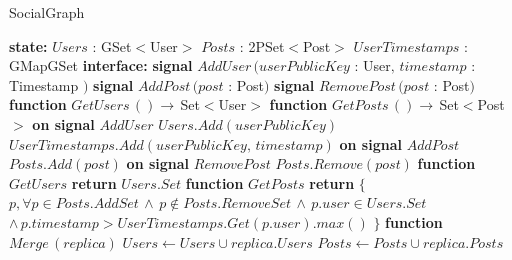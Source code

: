 \documentclass{article}
\begin{document}
\begin{algorithm}
\caption{SocialGraph}
\begin{algorithmic}
\State \textbf{state:}
\State \hspace{\algorithmicindent} $Users$ : GSet$<$User$>$ 
\State \hspace{\algorithmicindent} $Posts$ : 2PSet$<$Post$>$ 
\State \hspace{\algorithmicindent} $UserTimestamps$ : GMapGSet 
\State
\State \textbf{interface:}
\State \hspace{\algorithmicindent} \textbf{signal} $AddUser\,(userPublicKey$ : User$,\,timestamp$ : Timestamp $)$
\State \hspace{\algorithmicindent} \textbf{signal} $AddPost\,(post$ : Post$)$
\State \hspace{\algorithmicindent} \textbf{signal} $RemovePost\,(post$ : Post$)$
\State \hspace{\algorithmicindent} \textbf{function} $GetUsers\,() \rightarrow\, $Set$<$User$>$
\State \hspace{\algorithmicindent} \textbf{function} $GetPosts\,() \rightarrow\, $Set$<$Post$>$
\State
\State \textbf{on signal} $AddUser$
\State \hspace{\algorithmicindent} $Users.Add(userPublicKey)$
\State \hspace{\algorithmicindent} $UserTimestamps.Add(userPublicKey,\,timestamp)$
\State
\State \textbf{on signal} $AddPost$
\State \hspace{\algorithmicindent} $Posts.Add(post)$
\State
\State \textbf{on signal} $RemovePost$
\State \hspace{\algorithmicindent} $Posts.Remove(post)$
\State
\State \textbf{function} $GetUsers$
\State \hspace{\algorithmicindent}\textbf{return} $Users.Set$
\State
\State \textbf{function} $GetPosts$
\State \hspace{\algorithmicindent}\textbf{return} $\{$
\State \hspace{\algorithmicindent}\hspace{\algorithmicindent} $p, \forall p \in Posts.AddSet \,\land\, p \not\in Posts.RemoveSet \,\land\, p.user \in Users.Set$
\State \hspace{\algorithmicindent}\hspace{\algorithmicindent} $ \land\, p.timestamp > UserTimestamps.Get(p.user).max()$
\State \hspace{\algorithmicindent}$\}$
\State {}
\State {}
\State
\State \textbf{function} $Merge\,(replica)$
\State \hspace{\algorithmicindent} $Users \leftarrow Users \cup replica.Users$
\State \hspace{\algorithmicindent} $Posts \leftarrow Posts \cup replica.Posts$
\end{algorithmic}
\end{algorithm}
\end{document}
